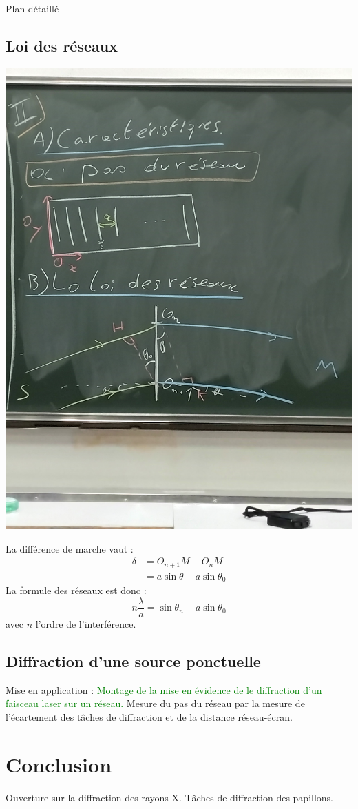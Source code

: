 \begin{reportBlock}{Plan détaillé}
  \subsection{Loi des réseaux}
  \begin{center}
      \includegraphics[scale=0.1]{LP_DiffractionPeriodique/Reseau.jpg}
  \end{center}
  La différence de marche vaut :
\begin{align*}
\delta &= O_{n+1}M-O_{n}M \\
           &= a\sin{\theta} - a\sin{\theta_0}
\end{align*}
La formule des réseaux est donc :
\begin{equation}
    n\frac{\lambda}{a} = \sin{\theta_n} - a\sin{\theta_0}
\end{equation}
avec $n$ l'ordre de l'interférence.

\subsection{Diffraction d'une source ponctuelle}
Mise en application : \textcolor{green}{Montage de la mise en évidence de le diffraction d'un faisceau laser sur un réseau.} Mesure du pas du réseau par la mesure de l'écartement des tâches de diffraction et de la distance réseau-écran. 

\section{Conclusion}
Ouverture sur la diffraction des rayons X. Tâches de diffraction des papillons.
\end{reportBlock}


